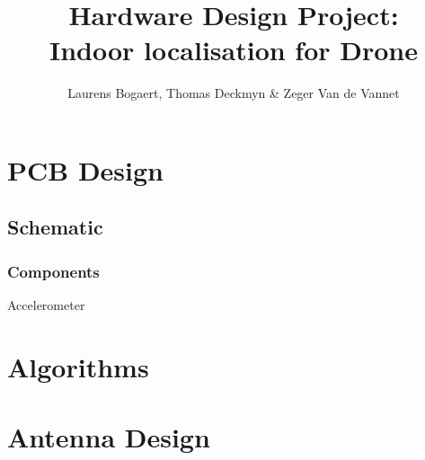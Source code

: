 \documentclass{beamer}
\title{\textbf{Hardware Design Project:}\\Indoor localisation for Drone}
\author{Laurens Bogaert, Thomas Deckmyn \& Zeger Van de Vannet}
\begin{document}
\begin{frame}
  \titlepage
\end{frame}

\section{PCB Design}
  \subsection{Schematic}
  \begin{frame}
    \frametitle{Components}
    Accelerometer
  \end{frame}
\section{Algorithms}
\section{Antenna Design}
\end{document}

